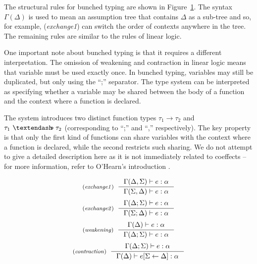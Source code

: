 The structural rules for bunched typing are shown in Figure~\ref{fig:substructural-bunched}.
The syntax $\Gamma(\Delta)$ is used to mean an assumption tree that contains $\Delta$ as a
sub-tree and so, for example, (\emph{exchange1}) can switch the order of contexts anywhere in the
tree. The remaining rules are similar to the rules of linear logic.

One important note about bunched typing is that it requires a different interpretation. The omission
of weakening and contraction in linear logic means that variable must be used exactly once.
In bunched typing, variables may still be duplicated, but only using the ``;'' separator.
The type system can be interpreted as specifying whether a variable may be shared between the
body of a function and the context where a function is declared.

The system introduces two
distinct function types $\tau_1 \rightarrow \tau_2$ and $\tau_1~ \textendash\!\!\!\ast \tau_2$
(corresponding to ``;'' and ``,'' respectively). The key property is that only the first kind
of functions can share variables with the context where a function is declared, while the second
restricts such sharing. We do not attempt to give a detailed description here as it is not
immediately related to coeffects -- for more information, refer to O'Hearn's introduction
\cite{substruct-bunched}.

\begin{figure}
\begin{equation*}
\tyrule{exchange1}
  {\Gamma(\Delta, \Sigma) \vdash e : \alpha}
  {\Gamma(\Sigma, \Delta) \vdash e : \alpha}
\end{equation*}
\begin{equation*}
\tyrule{exchange2}
  {\Gamma(\Delta; \Sigma) \vdash e : \alpha}
  {\Gamma(\Sigma; \Delta) \vdash e : \alpha}
\end{equation*}
\begin{equation*}
\tyrule{weakening}
  {\Gamma(\Delta) \vdash e : \alpha}
  {\Gamma(\Delta; \Sigma) \vdash e : \alpha}
\end{equation*}
\begin{equation*}
\tyrule{contraction}
  {\Gamma(\Delta; \Sigma) \vdash e : \alpha}
  {\Gamma(\Delta) \vdash \subst{e}{\Sigma}{\Delta} : \alpha}
\end{equation*}
\label{fig:substructural-bunched}
\end{figure}


